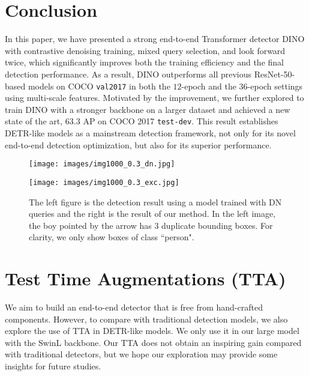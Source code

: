 \documentclass[runningheads]{llncs}
\begin{document}
\section{Conclusion}
In this paper, we have presented a strong end-to-end Transformer detector DINO with contrastive denoising training, mixed query selection, and look forward twice, which significantly improves both the training efficiency and the final detection performance. As a result, DINO outperforms all previous ResNet-50-based models on COCO \texttt{val2017} in both the $12$-epoch and the $36$-epoch settings using multi-scale features. Motivated by the improvement, we further explored to train DINO with a stronger backbone on a larger dataset and achieved a new state of the art, $63.3$ AP on COCO 2017 \texttt{test-dev}. This result establishes DETR-like models as a mainstream detection framework, not only for its novel end-to-end detection optimization, but also for its superior performance.


\begin{figure}[h]
    \centering
    \begin{minipage}[t]{0.45\textwidth}
    \begin{center}
\texttt{[image: images/img1000\_0.3\_dn.jpg]}
\end{center}
\end{minipage}
\hfill
\vspace{-0.3cm}
\begin{minipage}[t]{0.45\textwidth}
\begin{center}
\texttt{[image: images/img1000\_0.3\_exc.jpg]}
\vspace{-0.2cm}
\end{center}
\end{minipage}

    \caption{The left figure is the detection result using a model trained with DN queries and the right is the result of our method. In the left image, the boy pointed by the arrow has $3$ duplicate bounding boxes. For clarity, we only show boxes of class ``person".}
\label{fig:sample images}
    \vspace{-0.3cm}
\end{figure}
 \clearpage
{\small


}
\newpage
\appendix
\section{Test Time Augmentations (TTA)}
\label{section:tta}
We aim to build an end-to-end detector that is free from hand-crafted components. However, to compare with traditional detection models, we also explore the use of TTA in DETR-like models. We only use it in our large model with the SwinL backbone. Our TTA does not obtain an inspiring gain compared with traditional detectors, but we hope our exploration may provide some insights for future studies.
\end{document}
